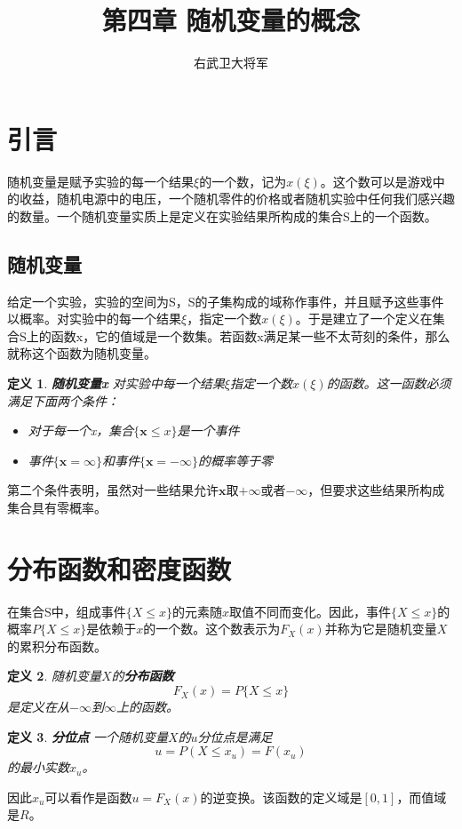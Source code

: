 \documentclass{ctexart}
\author{右武卫大将军}
\title{第四章 随机变量的概念}
\newtheorem{Definition}{\hspace{2em}定义}[section]
\begin{document}
    \maketitle
    \section{引言}
        随机变量是赋予实验的每一个结果$\xi$的一个数，记为$x(\xi)$。这个数可以是游戏中的收益，随机电源中的电压，一个随机零件的价格或者随机实验中任何我们感兴趣的数量。一个随机变量实质上是定义在实验结果所构成的集合S上的一个函数。

        \subsection{随机变量}
            给定一个实验，实验的空间为S，S的子集构成的域称作事件，并且赋予这些事件以概率。对实验中的每一个结果$\xi$，指定一个数$x(\xi)$。于是建立了一个定义在集合S上的函数x，它的值域是一个数集。若函数x满足某一些不太苛刻的条件，那么就称这个函数为随机变量。
            \begin{Definition}  
                \textbf{随机变量x}  对实验中每一个结果$\xi$指定一个数$x(\xi)$的函数。这一函数必须满足下面两个条件：
                \begin{itemize}
                    \item 对于每一个x，集合$\{\textbf{x}\le x\}$是一个事件
                    \item 事件$\{\textbf{x}=\infty\}$和事件$\{\textbf{x}=-\infty\}$的概率等于零
                \end{itemize}
            \end{Definition}
            第二个条件表明，虽然对一些结果允许$\textbf{x}$取$+\infty$或者$-\infty$，但要求这些结果所构成集合具有零概率。
       \section{分布函数和密度函数}
            在集合S中，组成事件$\{X\le x\}$的元素随$x$取值不同而变化。因此，事件$\{X\le x\}$的概率$P\{X\le x\}$是依赖于$x$的一个数。这个数表示为$F_X(x)$并称为它是随机变量$X$的累积分布函数。
            \begin{Definition}
                随机变量$X$的\textbf{分布函数}
                $$
                    F_X(x) = P\{X\le x\}
                $$
                是定义在从$-\infty$到$\infty$上的函数。
            \end{Definition}
            \begin{Definition}
                \textbf{分位点} 一个随机变量$X$的$u$分位点是满足
                $$
                    u = P(X\le x_u) = F(x_u)
                $$
                的最小实数$x_u$。
            \end{Definition}
            因此$x_u$可以看作是函数$u=F_X(x)$的逆变换。该函数的定义域是$[0,1]$，而值域是$R$。
\end{document}
